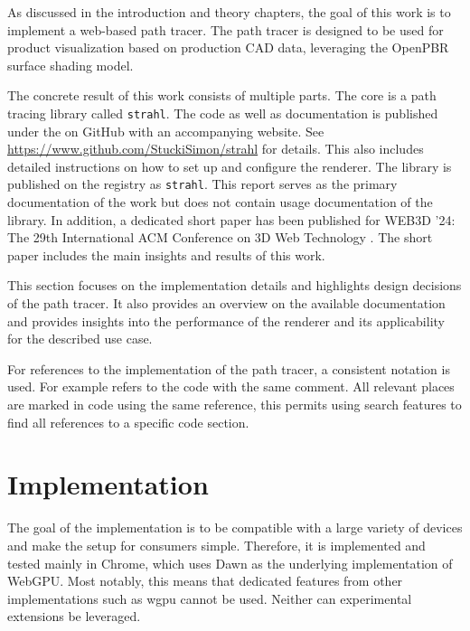 
As discussed in the introduction and theory chapters, the goal of this work is to implement a web-based path tracer. The path tracer is designed to be used for product visualization based on production \gls{CAD} data, leveraging the \gls{OpenPBR} surface shading model.

The concrete result of this work consists of multiple parts. The core is a path tracing library called \texttt{strahl}. The code as well as documentation is published under the  on GitHub with an accompanying website. See \url{https://www.github.com/StuckiSimon/strahl} for details. This also includes detailed instructions on how to set up and configure the renderer. The library is published on the  registry as \texttt{strahl}. This report serves as the primary documentation of the work but does not contain usage documentation of the library. In addition, a dedicated short paper has been published for WEB3D '24: The 29th International ACM Conference on 3D Web Technology \cite{ownShortPaper}. The short paper includes the main insights and results of this work.

This section focuses on the implementation details and highlights design decisions of the path tracer. It also provides an overview on the available documentation and provides insights into the performance of the renderer and its applicability for the described use case.

For references to the implementation of the path tracer, a consistent notation is used. For example  refers to the code with the same comment. All relevant places are marked in code using the same reference, this permits using search features to find all references to a specific code section.

\section{Implementation}

The goal of the implementation is to be compatible with a large variety of devices and make the setup for consumers simple. Therefore, it is implemented and tested mainly in Chrome, which uses \gls{Dawn} as the underlying implementation of \gls{WebGPU}. Most notably, this means that dedicated features from other implementations such as \gls{wgpu} cannot be used. Neither can experimental extensions be leveraged.

